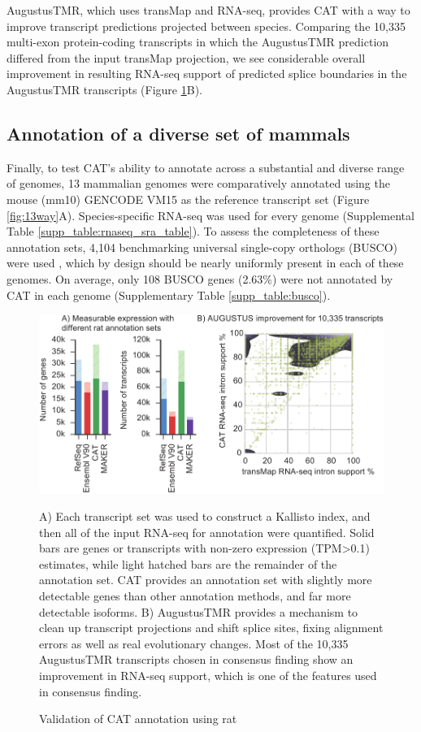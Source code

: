 \documentclass[fleqn,10pt]{wlscirep}
\begin{document}
AugustusTMR, which uses transMap and RNA-seq, provides CAT with a way to improve transcript predictions projected between species. Comparing the 10,335 multi-exon protein-coding transcripts in which the AugustusTMR prediction differed from the input transMap projection, we see considerable overall improvement in resulting RNA-seq support of predicted splice boundaries in the AugustusTMR transcripts (Figure \ref{fig:rat_validation}B). 

\subsection*{Annotation of a diverse set of mammals}

Finally, to test CAT's ability to annotate across a substantial and diverse range of genomes, 13 mammalian genomes were comparatively annotated using the mouse (mm10) GENCODE VM15 as the reference transcript set (Figure \ref{fig:13way}A). Species-specific RNA-seq was used for every genome (Supplemental Table \ref{supp_table:rnaseq_sra_table}). To assess the completeness of these annotation sets, 4,104 benchmarking universal single-copy orthologs (BUSCO) were used  \citep{simao2015busco}, which by design should be nearly uniformly present in each of these genomes. On average, only 108 BUSCO genes (2.63\%) were not annotated by CAT in each genome (Supplementary Table \ref{supp_table:busco}). 


\begin{figure}
\centering
\includegraphics[width=\textwidth,height=\textheight,keepaspectratio]{figure5-rat_v18.pdf}
\caption{Validation of CAT annotation using rat}
A) Each transcript set was used to construct a Kallisto  \citep{bray2015near} index, and then all of the input RNA-seq for annotation were quantified. Solid bars are genes or transcripts with non-zero expression (TPM\textgreater 0.1) estimates, while light hatched bars are the remainder of the annotation set. CAT provides an annotation set with slightly more detectable genes than other annotation methods, and far more detectable isoforms. B) AugustusTMR provides a mechanism to clean up transcript projections and shift splice sites, fixing alignment errors as well as real evolutionary changes. Most of the 10,335 AugustusTMR transcripts chosen in consensus finding show an improvement in RNA-seq support, which is one of the features used in consensus finding.
\label{fig:rat_validation}
\end{figure}
\end{document}
